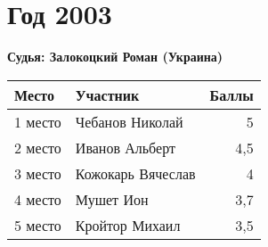 \chapter{Год 2003}
\textbf{Судья: Залокоцкий Роман (Украина)}

\begin{tabularx}{\textwidth}{l l r}
Место & Участник & Баллы \\
\hline
1 место & Чебанов Николай & 5 \\
2 место & Иванов Альберт & 4,5 \\
3 место & Кожокарь Вячеслав & 4 \\
4 место & Мушет Ион & 3,7 \\
5 место & Кройтор Михаил & 3,5 \\
\end{tabularx}